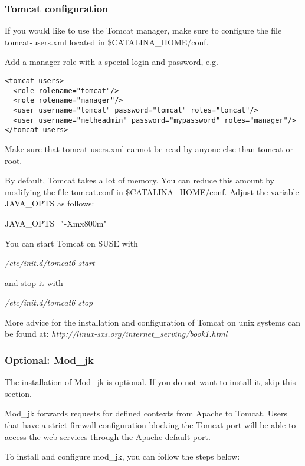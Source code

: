 \documentclass{book}
\begin{document}
\subsubsection{Tomcat configuration}

If you would like to use the Tomcat manager, make sure to configure
the file tomcat-users.xml located in \$CATALINA\_HOME/conf.

Add a manager role with a special login and password, e.g.
\begin{lstlisting}
<tomcat-users>
  <role rolename="tomcat"/>
  <role rolename="manager"/>
  <user username="tomcat" password="tomcat" roles="tomcat"/>
  <user username="metheadmin" password="mypassword" roles="manager"/>
</tomcat-users>
\end{lstlisting}

Make sure that tomcat-users.xml cannot be read by anyone else than
tomcat or root.

By default, Tomcat takes a lot of memory. You can reduce this amount
by modifying the file tomcat.conf in \$CATALINA\_HOME/conf.
Adjust the variable JAVA\_OPTS as follows:

JAVA\_OPTS="-Xmx800m"

You can start Tomcat on SUSE with

 \textit{/etc/init.d/tomcat6 start}

and stop it with

 \textit{/etc/init.d/tomcat6 stop}

More advice for the installation and configuration of Tomcat on unix systems
can be found at: \textit{http://linux-sxs.org/internet\_serving/book1.html}

\subsubsection{Optional: Mod\_jk}

The installation of Mod\_jk is optional. If you do not want to install it,
skip this section.

Mod\_jk forwards requests for defined contexts from Apache to Tomcat.
Users that have a strict firewall configuration blocking the Tomcat port
will be able to access the web services through the Apache default port.

To install and configure mod\_jk, you can follow the steps below:
\end{document}
